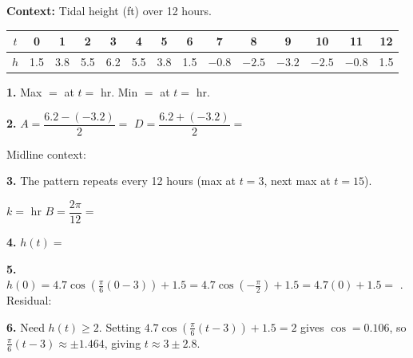 \documentclass[10pt]{article}
\begin{document}
\begin{tcolorbox}[colback=white, colframe=black!40,
    title=\textbf{Tier A --- Apply (Key)},
    fonttitle=\bfseries, arc=2mm, left=3mm, right=3mm, top=2mm, bottom=2mm]

\textbf{Context:} Tidal height (ft) over 12 hours.

\vspace{4pt}
\begin{center}
\renewcommand{\arraystretch}{1.3}
\small
\begin{tabular}{|c|c|c|c|c|c|c|c|c|c|c|c|c|c|}
\hline
$t$ & 0 & 1 & 2 & 3 & 4 & 5 & 6 & 7 & 8 & 9 & 10 & 11 & 12 \\
\hline
$h$ & 1.5 & 3.8 & 5.5 & 6.2 & 5.5 & 3.8 & 1.5 & $-0.8$ & $-2.5$ & $-3.2$ & $-2.5$ & $-0.8$ & 1.5 \\
\hline
\end{tabular}
\end{center}

\vspace{4pt}
\textbf{1.} Max $= $  at $t = $  hr. \quad Min $= $  at $t = $  hr.

\vspace{4pt}
\textbf{2.} $A = \dfrac{6.2-(-3.2)}{2} = $  \quad $D = \dfrac{6.2+(-3.2)}{2} = $ 

Midline context: 

\vspace{4pt}
\textbf{3.} The pattern repeats every 12 hours (max at $t=3$, next max at $t=15$).

$k = $  hr \quad $B = \dfrac{2\pi}{12} = $ 

\vspace{4pt}
\textbf{4.} $h(t) = $ 

\vspace{4pt}
\textbf{5.} $h(0) = 4.7\cos\!\left(\tfrac{\pi}{6}(0-3)\right)+1.5 = 4.7\cos\!\left(-\tfrac{\pi}{2}\right)+1.5 = 4.7(0)+1.5 = $ . Residual: 

\vspace{4pt}
\textbf{6.} Need $h(t) \geq 2$. Setting $4.7\cos\!\left(\tfrac{\pi}{6}(t-3)\right)+1.5 = 2$ gives $\cos = 0.106$, so
$\tfrac{\pi}{6}(t-3) \approx \pm 1.464$, giving $t \approx 3 \pm 2.8$.


\end{tcolorbox}
\end{document}
